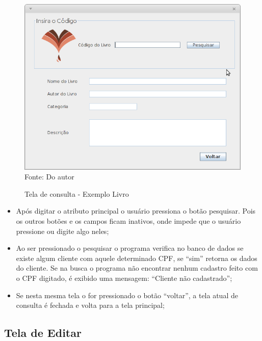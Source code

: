 \begin{figure}[H]
	\centering 
	\caption{Tela de consulta - Exemplo Livro}
	\label{consulta_livro}
	\includegraphics[scale = 0.6]{imagens/tela-consulta-livro.png}
	\\Fonte: Do autor
\end{figure}



\begin{itemize}
 \item Após digitar o atributo principal o usuário pressiona o botão pesquisar. Pois os outros botões e os campos ficam inativos, onde impede que o usuário pressione ou digite algo neles;

 \item Ao ser pressionado o pesquisar o programa verifica no banco de dados se existe algum cliente com aquele determinado CPF, se “sim” retorna os dados do cliente. Se na busca o programa não encontrar nenhum cadastro feito com o CPF digitado, é exibido uma mensagem: “Cliente não cadastrado”; 

 \item Se nesta mesma tela o for pressionado o botão “voltar”, a tela atual de consulta é fechada e volta para a tela principal;
\end{itemize}


\subsection{Tela de Editar}


